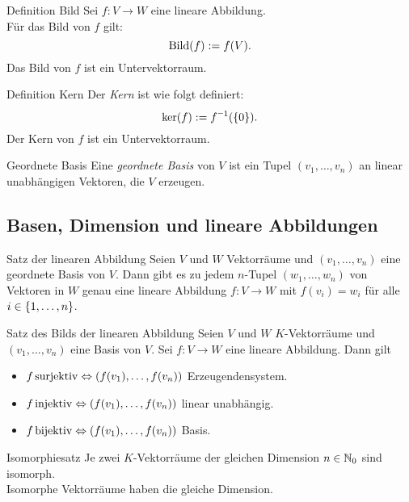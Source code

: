 \documentclass[main.tex]{subfiles}
\begin{document}
\begin{karte}{Definition Bild}
    Sei \( f: V \rightarrow W \) eine lineare Abbildung.\\
    Für das Bild von \(f\) gilt:
    \[ \operatorname{Bild}(f) := f(V). \]
    Das Bild von \(f\) ist ein Untervektorraum.
\end{karte}
\begin{karte}{Definition Kern}
    Der \textit{Kern} ist wie folgt definiert:
    \[ \ker(f) := \inverse{f}(\set{0}). \]
    Der Kern von \(f\) ist ein Untervektorraum.
\end{karte}
\begin{karte}{Geordnete Basis}
    Eine \textit{geordnete Basis} von \(V\) ist ein Tupel \( (v_1,\ldots,v_n) \) 
    an linear unabhängigen Vektoren, die \(V\) erzeugen.
\end{karte}
\subsection*{Basen, Dimension und lineare Abbildungen}
\begin{karte}{Satz der linearen Abbildung} %
    Seien \(V\) und \(W\) Vektorräume und \( (v_1,\ldots,v_n) \) 
    eine geordnete Basis von \(V\). Dann gibt es zu jedem 
    \(n\)-Tupel \((w_1,\ldots,w_n)\) von Vektoren in \(W\) 
    genau eine lineare Abbildung \( f: V \rightarrow W \) mit 
    \( f(v_i) = w_i \) für alle \( i \in \{1,\ldots,n\} \).
\end{karte}
\begin{karte}{Satz des Bilds der linearen Abbildung}%
    Seien \(V\) und \(W\) \(K\)-Vektorräume und 
    \((v_1,\ldots,v_n)\) eine Basis von \(V\). Sei 
    \( f : V \rightarrow W \) eine lineare Abbildung. Dann gilt 
    \begin{itemize}
        \item \( f \operatorname{surjektiv} \Leftrightarrow 
        (f(v_1),\ldots,f(v_n)) \) Erzeugendensystem.
        \item \( f \operatorname{injektiv} \Leftrightarrow 
        (f(v_1),\ldots,f(v_n)) \) linear unabhängig.
        \item \( f \operatorname{bijektiv} \Leftrightarrow
        (f(v_1),\ldots,f(v_n)) \) Basis.
    \end{itemize}
\end{karte}
\begin{karte}{Isomorphiesatz}
    Je zwei \(K\)-Vektorräume der gleichen Dimension 
    \( n \in \mathbb{N}_0 \) sind isomorph.\\
    Isomorphe Vektorräume haben die gleiche Dimension.
\end{karte}
\end{document}
